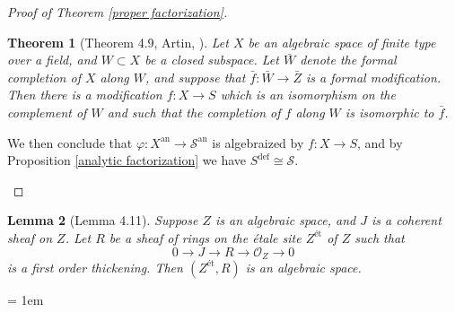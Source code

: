 \documentclass{amsart}
\newtheorem{theorem}{Theorem}[subsection]
\newtheorem{lemma}[theorem]{Lemma}
\theoremstyle{definition}
\numberwithin{equation}{section}
\newcommand{\definable}{\mathrm{def}}
\newcommand{\analytic}{\mathrm{an}}
\begin{document}
\begin{proof}[Proof of Theorem \ref{proper factorization}]
\begin{enumerate}
    \begin{theorem}[Theorem 4.9, Artin, {\cite[Theorem (3.1)]{zbMATH03283964}}]
      Let $X$ be an algebraic space of finite type over a field, and $W\subset X$ be a closed subspace.
      Let $\bar{W}$ denote the formal completion of $X$ along $W$,
      and suppose that $\bar{f}: \bar{W} \to \bar{Z}$ is a formal modification.
      Then there is a modification $f:X \to S$ which is an isomorphism on the complement of $W$
      and such that the completion of $f$ along $W$ is isomorphic to $\bar{f}$.
    \end{theorem}
    
    We then conclude that $\varphi:X^\analytic \to \mathcal{S}^\analytic$ is algebraized by $f: X \to S$,
    and by Proposition \ref{analytic factorization} we have $S^\definable \cong \mathcal{S}$.
  \end{enumerate}
\end{proof}

\begin{lemma}[Lemma 4.11]
  Suppose $Z$ is an algebraic space,
  and $J$ is a coherent sheaf on $Z$.
  Let $R$ be a sheaf of rings on the {\'e}tale site $Z^{\text{\' et}}$ of $Z$ such that
  \[
    0 \to J \to R \to \mathcal{O}_Z \to 0
  \]
  is a first order thickening.
  Then $(Z^{\text{\'et}},R)$ is an algebraic space.
\end{lemma}

\emergencystretch = 1em
\printbibliography
\end{document}

